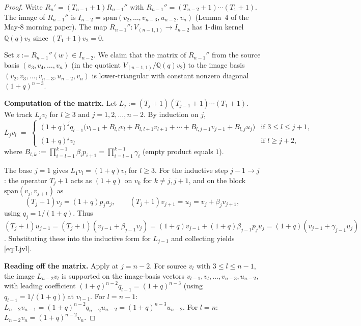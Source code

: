 \documentclass[11pt]{article}
\theoremstyle{definition}
\begin{document}
\begin{proof}
Write $R_n' = (T_{n-1}{+}1) R_{n-1}''$ with
$R_{n-1}'' = (T_{n-2}{+}1)\cdots(T_1{+}1)$.  The image of $R_{n-1}''$
is $I_{n-2} = \mathrm{span}(v_2,\ldots,v_{n-3}, u_{n-2}, v_n)$
(Lemma~4 of the May-8 morning paper).  The map
$R_{n-1}''\colon V_{(n-1,1)} \to I_{n-2}$ has 1-dim kernel
$\mathbb{Q}(q) v_2$ since $(T_1{+}1) v_2 = 0$.

Set $z := R_{n-1}''(w) \in I_{n-2}$.  We claim that the matrix of
$R_{n-1}''$ from the source basis $(v_3, v_4, \ldots, v_n)$ (in the
quotient $V_{(n-1,1)}/\mathbb{Q}(q) v_2$) to the image basis
$(v_2, v_3, \ldots, v_{n-3}, u_{n-2}, v_n)$ is lower-triangular with
constant nonzero diagonal $(1+q)^{n-3}$.

\medskip
\textbf{Computation of the matrix.}  Let
$L_j := (T_j{+}1)(T_{j-1}{+}1)\cdots(T_1{+}1)$.  We track $L_j v_l$
for $l \ge 3$ and $j = 1, 2, \ldots, n-2$.  By induction on $j$,
\begin{equation}\label{eq:Ljvl}
   L_j v_l \;=\;
   \begin{cases}
   (1+q)^j q_{l-1} \bigl(v_{l-1} + B_{l,l} v_l + B_{l,l+1} v_{l+1} +
   \cdots + B_{l,j-1} v_{j-1} + B_{l,j} u_j\bigr) & \text{if } 3 \le l \le j+1,\\
   (1+q)^j v_l & \text{if } l \ge j+2,
   \end{cases}
\end{equation}
where $B_{l,k} := \prod_{i=l-1}^{k-1}\beta_i p_{i+1} = \prod_{i=l-1}^{k-1}\gamma_i$
(empty product equals $1$).

The base $j = 1$ gives $L_1 v_l = (1+q) v_l$ for $l \ge 3$.  For the
inductive step $j-1 \to j$: the operator $T_j{+}1$ acts as $(1+q)$ on
$v_k$ for $k \ne j, j+1$, and on the block $\mathrm{span}(v_j, v_{j+1})$ as
\[
   (T_j{+}1) v_j = (1+q) p_j u_j,
   \qquad
   (T_j{+}1) v_{j+1} = u_j
   = v_j + \beta_j v_{j+1},
\]
using $q_j = 1/(1+q)$.  Thus $(T_j{+}1) u_{j-1} = (T_j{+}1)(v_{j-1} +
\beta_{j-1} v_j) = (1+q) v_{j-1} + (1+q) \beta_{j-1} p_j u_j =
(1+q)(v_{j-1} + \gamma_{j-1} u_j)$.  Substituting these into the
inductive form for $L_{j-1}$ and collecting yields \eqref{eq:Ljvl}.

\medskip
\textbf{Reading off the matrix.} Apply at $j = n-2$.  For source
$v_l$ with $3 \le l \le n-1$, the image $L_{n-2} v_l$ is supported on
the image-basis vectors $v_{l-1}, v_l, \ldots, v_{n-3}, u_{n-2}$,
with leading coefficient $(1+q)^{n-2} q_{l-1} = (1+q)^{n-3}$ (using
$q_{l-1} = 1/(1+q)$) at $v_{l-1}$.  For $l = n-1$: $L_{n-2}
v_{n-1} = (1+q)^{n-2} q_{n-2} u_{n-2} = (1+q)^{n-3} u_{n-2}$.  For
$l = n$: $L_{n-2} v_n = (1+q)^{n-2} v_n$.


\end{proof}
\end{document}
